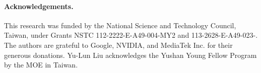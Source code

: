 \documentclass[10pt,twocolumn,letterpaper]{article}
\begin{document}
\title{\paperTitle}
\author{\authorBlock}
\maketitle







% 



\paragraph{Acknowledgements.}
This research was funded by the National Science and Technology Council, Taiwan, under Grants NSTC 112-2222-E-A49-004-MY2 and 113-2628-E-A49-023-. The authors are grateful to Google, NVIDIA, and MediaTek Inc. for their generous donations. Yu-Lun Liu acknowledges the Yushan Young Fellow Program by the MOE in Taiwan.


{\small


}

\ifarxiv \clearpage \appendix  \fi
\end{document}
